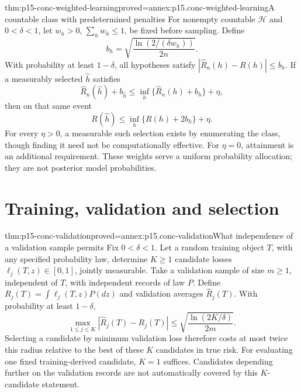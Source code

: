\begin{hbtheorem}{thm:p15-conc-weighted-learning}{proved=annex:p15.conc-weighted-learning}{A countable class with predetermined penalties}
For nonempty countable \(\mathcal H\) and \(0<\delta<1\), let \(w_h>0\),
\(\sum_hw_h\leq1\), be fixed before sampling. Define
\[
                  b_h=\sqrt{\frac{\ln(2/(\delta w_h))}{2n}}.
\]
With probability at least \(1-\delta\), all hypotheses satisfy
\(|\widehat R_n(h)-R(h)|\leq b_h\).
If a measurably selected \(\widehat h\) satisfies
\[
 \widehat R_n(\widehat h)+b_{\widehat h}
       \leq\inf_h\{\widehat R_n(h)+b_h\}+\eta,
\]
then on that same event
\[
              R(\widehat h)\leq
                    \inf_h\{R(h)+2b_h\}+\eta.
\]
For every \(\eta>0\), a measurable such selection exists by
enumerating the class, though finding it need not be computationally
effective. For \(\eta=0\), attainment is an additional requirement.
These weights serve a uniform probability allocation; they are
not posterior model probabilities.
\end{hbtheorem}

\section{Training, validation and selection}

\begin{hbtheorem}{thm:p15-conc-validation}{proved=annex:p15.conc-validation}{What independence of a validation sample permits}
Fix \(0<\delta<1\). Let a random training object \(T\), with any specified probability
law, determine \(K\geq1\) candidate losses
\(\ell_j(T,z)\in[0,1]\), jointly measurable.
Take a validation sample of size \(m\geq1\), independent of \(T\),
with independent records of law \(P\).
Define \(R_j(T)=\int\ell_j(T,z)P(dz)\) and validation averages
\(\widehat R_j(T)\). With probability at least \(1-\delta\),
\[
 \max_{1\leq j\leq K}|\widehat R_j(T)-R_j(T)|
                \leq\sqrt{\frac{\ln(2K/\delta)}{2m}}.
\]
Selecting a candidate by minimum validation loss therefore
costs at most twice this radius relative to the best of these
\(K\) candidates in true risk. For evaluating one fixed
training-derived candidate, \(K=1\) suffices.
Candidates depending further on the validation records are
not automatically covered by this \(K\)-candidate statement.
\end{hbtheorem}

